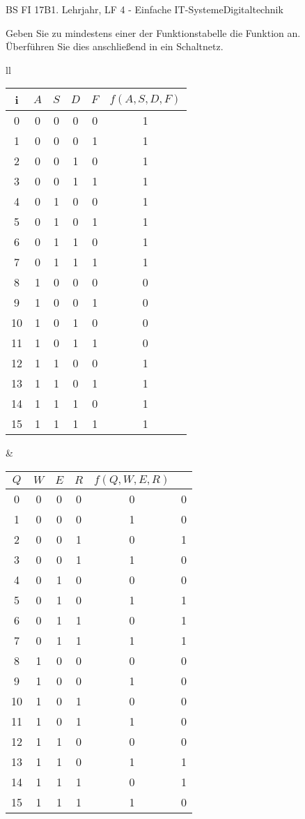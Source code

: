 \documentclass[oneside,openany,headings=optiontotoc,11pt,numbers=noenddot]{scrreprt}
\begin{document}
	\begin{worksheet}{BS FI 17B}{1. Lehrjahr, LF 4 - Einfache IT-Systeme}{Digitaltechnik}
		\begin{framed}
			\noindent
			Geben Sie zu mindestens einer der Funktionstabelle die Funktion an.\\
			Überführen Sie dies anschließend in ein Schaltnetz.\\
			\par\noindent
			\begin{tabular}{ll}
				\begin{tabularx}{0.45\textwidth}{c|c|c|c|c|c}
					i & \(A\) & \(S\) & \(D\) & \(F\) & \(f(A, S, D, F)\)\\
					\hline
					0 & 0 & 0 & 0 & 0 & 1\\
					1 & 0 & 0 & 0 & 1 & 1\\
					2 & 0 & 0 & 1 & 0 & 1\\
					3 & 0 & 0 & 1 & 1 & 1\\
					4 & 0 & 1 & 0 & 0 & 1\\
					5 & 0 & 1 & 0 & 1 & 1\\
					6 & 0 & 1 & 1 & 0 & 1\\
					7 & 0 & 1 & 1 & 1 & 1\\
					8 & 1 & 0 & 0 & 0 & 0\\
					9 & 1 & 0 & 0 & 1 & 0\\
					10 & 1 & 0 & 1 & 0 & 0\\
					11 & 1 & 0 & 1 & 1 & 0\\
					12 & 1 & 1 & 0 & 0 & 1\\
					13 & 1 & 1 & 0 & 1 & 1\\
					14 & 1 & 1 & 1 & 0 & 1\\
					15 & 1 & 1 & 1 & 1 & 1
				\end{tabularx} &
				\begin{tabularx}{0.45\textwidth}{c|c|c|c|c|c}
					\(Q\) & \(W\) & \(E\) & \(R\) & \(f(Q, W, E, R)\)\\
					\hline
					0 & 0 & 0 & 0 & 0 & 0\\
					1 & 0 & 0 & 0 & 1 & 0\\
					2 & 0 & 0 & 1 & 0 & 1\\
					3 & 0 & 0 & 1 & 1 & 0\\
					4 & 0 & 1 & 0 & 0 & 0\\
					5 & 0 & 1 & 0 & 1 & 1\\
					6 & 0 & 1 & 1 & 0 & 1\\
					7 & 0 & 1 & 1 & 1 & 1\\
					8 & 1 & 0 & 0 & 0 & 0\\
					9 & 1 & 0 & 0 & 1 & 0\\
					10 & 1 & 0 & 1 & 0 & 0\\
					11 & 1 & 0 & 1 & 1 & 0\\
					12 & 1 & 1 & 0 & 0 & 0\\
					13 & 1 & 1 & 0 & 1 & 1\\
					14 & 1 & 1 & 1 & 0 & 1\\
					15 & 1 & 1 & 1 & 1 & 0
				\end{tabularx}
			\end{tabular}\\
		\end{framed}
	\end{worksheet}
\end{document}
